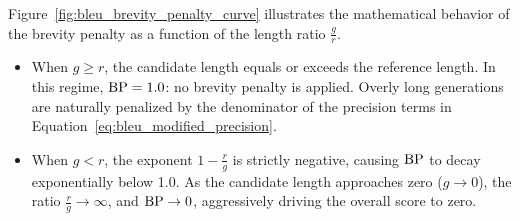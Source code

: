\documentclass[../../main.tex]{subfiles}
\begin{document}
Figure~\ref{fig:bleu_brevity_penalty_curve} illustrates the mathematical behavior of the brevity penalty as a function of the length ratio $\frac{g}{r}$.
\begin{itemize}
    \item When $g \ge r$, the candidate length equals or exceeds the reference length. In this regime, $\mathrm{BP} = 1.0$: no brevity penalty is applied. Overly long generations are naturally penalized by the denominator of the precision terms in Equation~\eqref{eq:bleu_modified_precision}.
    \item When $g < r$, the exponent $1 - \frac{r}{g}$ is strictly negative, causing $\mathrm{BP}$ to decay exponentially below 1.0. As the candidate length approaches zero ($g \to 0$), the ratio $\frac{r}{g} \to \infty$, and $\mathrm{BP} \to 0$, aggressively driving the overall score to zero.
\end{itemize}
\end{document}
